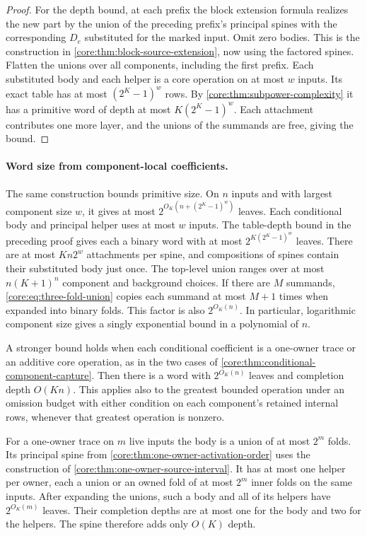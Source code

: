 \begin{proof}
For the depth bound, at each prefix the block extension formula
realizes the new part by the union of the preceding prefix's principal
spines with the corresponding $D_e$ substituted for the marked input.
Omit zero bodies. This is the construction in
\cref{core:thm:block-source-extension}, now using the factored spines.
Flatten the unions over all components, including the first prefix.
Each substituted body and each helper is a core operation on at most
$w$ inputs. Its exact table has at most $(2^K-1)^w$ rows. By
\cref{core:thm:subpower-complexity} it has a primitive word of depth
at most $K(2^K-1)^w$. Each attachment contributes one more layer,
and the unions of the summands are free, giving the bound.
\end{proof}

\paragraph{Word size from component-local coefficients.}
The same construction bounds primitive size. On $n$ inputs
and with largest component size $w$, it gives at most
$2^{O_K(n+(2^K-1)^w)}$ leaves. Each conditional body and
principal helper uses at most $w$ inputs. The table-depth
bound in the preceding proof gives each a binary word
with at most $2^{K(2^K-1)^w}$ leaves. There are at most
$K n 2^w$ attachments per spine, and compositions of
spines contain their substituted body just once. The
top-level union ranges over at most $n(K+1)^n$ component
and background choices. If there are $M$ summands,
\cref{core:eq:three-fold-union} copies each summand
at most $M+1$ times when expanded into binary folds.
This factor is also $2^{O_K(n)}$. In particular,
logarithmic component size gives a singly exponential
bound in a polynomial of $n$.

A stronger bound holds when each conditional coefficient
is a one-owner trace or an additive core operation, as
in the two cases of
\cref{core:thm:conditional-component-capture}. Then there
is a word with $2^{O_K(n)}$ leaves and completion depth
$O(Kn)$. This applies also to the greatest bounded
operation under an omission budget with either condition
on each component's retained internal rows, whenever
that greatest operation is nonzero.

For a one-owner trace on $m$ live inputs the body is a
union of at most $2^m$ folds. Its principal spine from
\cref{core:thm:one-owner-activation-order} uses the
construction of \cref{core:thm:one-owner-source-interval}.
It has at most one helper per owner, each a union or
an owned fold of at most $2^m$ inner folds on the
same inputs. After expanding the unions, such a body
and all of its helpers have $2^{O_K(m)}$ leaves.
Their completion depths are at
most one for the body and two for the helpers.
The spine therefore adds only $O(K)$ depth.

